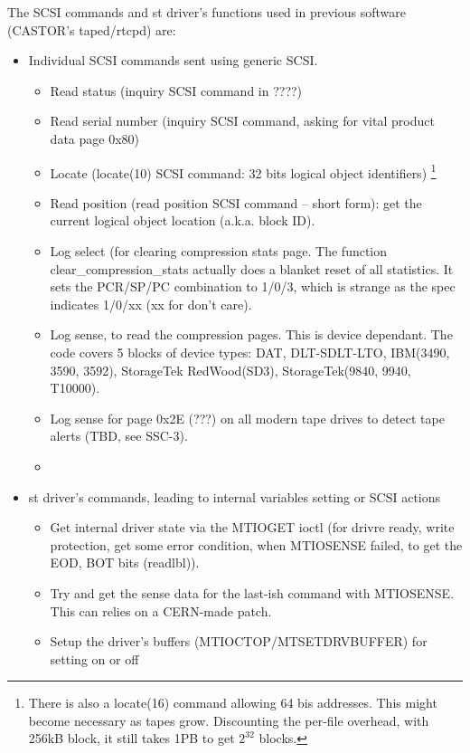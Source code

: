 The SCSI commands and st driver's functions used in previous software (CASTOR's taped/rtcpd) are:
\begin{itemize}
\item Individual SCSI commands sent using generic SCSI.
  \begin{itemize}
    \item Read status (inquiry SCSI command in ????)
    \item Read serial number (inquiry SCSI command, asking for vital product data page 0x80)
    \item Locate (locate(10) SCSI command: 32 bits logical object identifiers)
                      \footnote{There is also a locate(16) command allowing 64 bis addresses.
                      This might become necessary as tapes grow. Discounting the per-file overhead,
                      with 256kB block, it still takes 1PB to get $2^{32}$ blocks.}
    \item Read position (read position SCSI command -- short form): get the current logical object
          location (a.k.a. block ID).
    \item Log select (for clearing compression stats page. The function clear\_compression\_stats
          actually does a blanket reset of all statistics. It sets the PCR/SP/PC combination
          to 1/0/3, which is strange as the spec indicates 1/0/xx (xx for don't care).
    \item Log sense, to read the compression pages. This is device dependant. The code covers
          5 blocks of device types: DAT, DLT-SDLT-LTO, IBM(3490, 3590, 3592), StorageTek RedWood(SD3),
          StorageTek(9840, 9940, T10000).
    \item Log sense for page 0x2E (???) on all modern tape drives to detect tape alerts (TBD, see SSC-3).
    \item
  \end{itemize}
\item st driver's commands, leading to internal variables setting or SCSI actions
  \begin{itemize}
    \item Get internal driver state via the MTIOGET ioctl (for drivre ready, write protection, 
          get some error condition, when MTIOSENSE failed, to get the EOD, BOT bits (readlbl)).
    \item Try and get the sense data for the last-ish command with MTIOSENSE. This can
          relies on a CERN-made patch.
    \item Setup the driver's buffers (MTIOCTOP/MTSETDRVBUFFER) for setting on or off 

\end{itemize}
\end{itemize}
